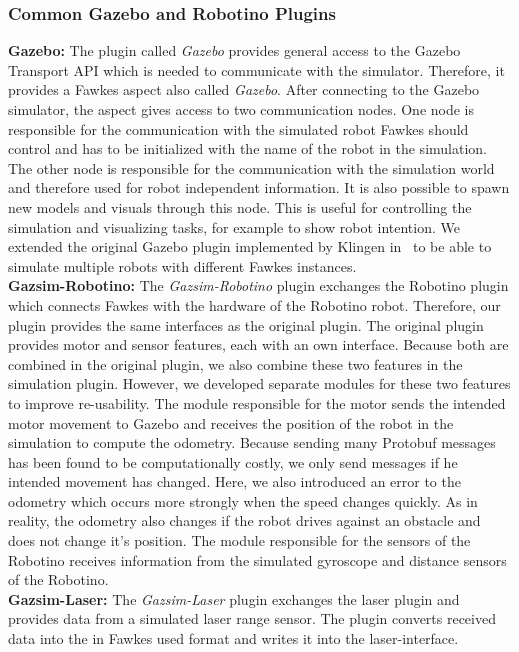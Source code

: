 \subsubsection{Common Gazebo and Robotino Plugins}
\textbf{Gazebo:} The plugin called \textit{Gazebo} provides general access to the Gazebo Transport API which is needed to communicate with the simulator. Therefore, it provides a Fawkes aspect also called \textit{Gazebo}. After connecting to the Gazebo simulator, the aspect gives access to two communication nodes. One node is responsible for the communication with the simulated robot Fawkes should control and has to be initialized with the name of the robot in the simulation. The other node is responsible for the communication with the simulation world and therefore used for robot independent information. It is also possible to spawn new models and visuals through this node. This is useful for controlling the simulation and visualizing tasks, for example to show robot intention. We extended the original Gazebo plugin implemented by Klingen in~\cite{KlingenDA} to be able to simulate multiple robots with different Fawkes instances.
\\
\textbf{Gazsim-Robotino:}
The \textit{Gazsim-Robotino} plugin exchanges the Robotino plugin which connects Fawkes with the hardware of the Robotino robot. Therefore, our plugin provides the same interfaces as the original plugin. The original plugin provides motor and sensor features, each with an own interface. Because both are combined in the original plugin, we also combine these two features in the simulation plugin. However, we developed separate modules for these two features to improve re-usability. The module responsible for the motor sends the intended motor movement to Gazebo and receives the position of the robot in the simulation to compute the odometry. Because sending many Protobuf messages has been found to be computationally costly, we only send messages if he intended movement has changed. Here, we also introduced an error to the odometry which occurs more strongly when the speed changes quickly. As in reality, the odometry also changes if the robot drives against an obstacle and does not change it's position. The module responsible for the sensors of the Robotino receives information from the simulated gyroscope and distance sensors of the Robotino.
\\
\textbf{Gazsim-Laser:}
The \textit{Gazsim-Laser} plugin exchanges the laser plugin and provides data from a simulated laser range sensor. The plugin converts received data into the in Fawkes used format and writes it into the laser-interface.
